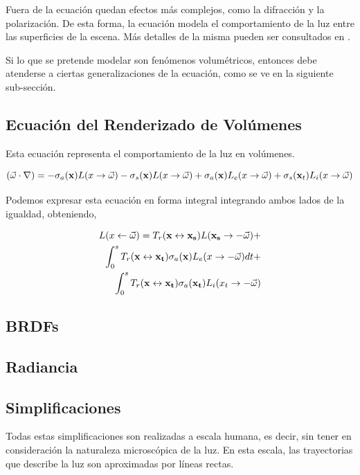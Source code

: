 Fuera de la ecuación quedan efectos más complejos, como la difracción y la polarización.
De esta forma, la ecuación modela el comportamiento de la luz entre las superficies de la escena.
Más detalles de la misma pueden ser consultados en \cite{Kajiya1986}.

Si lo que se pretende modelar son fenómenos volumétricos, entonces debe atenderse a ciertas generalizaciones de la ecuación, como se ve en la siguiente sub-sección.

\subsection{Ecuación del Renderizado de Volúmenes}

Esta ecuación representa el comportamiento de la luz en volúmenes.

\begin{equation}
(\vec{\omega} \cdot \nabla) = - \sigma_{a}(\bold{x}) L(x \rightarrow \vec{\omega}) - \sigma_{s}(\bold{x}) L(x \rightarrow \vec{\omega}) + \sigma_{a}(\bold{x}) L_{e}(x \rightarrow \vec{\omega}) + \sigma_{s}(\bold{x}_{t}) L_{i}(x \rightarrow \vec{\omega})
\end{equation}

Podemos expresar esta ecuación en forma integral integrando ambos lados de la igualdad, obteniendo,

\begin{equation}
\begin{aligned}
L(x \leftarrow \vec{\omega}) = T_{r}(\bold{x} \leftrightarrow \bold{x_{s}}) L(\bold{x_{s}} \rightarrow -\vec{\omega}) + \\
\int_{0}^{s}{T_{r}(\bold{x} \leftrightarrow \bold{x_{t}}) \sigma_{a}(\bold{x}) L_{e}(x \rightarrow -\vec{\omega}) dt } + \\
\int_{0}^{s}{T_{r}(\bold{x} \leftrightarrow \bold{x_{t}}) \sigma_{a}(\bold{x_{t}}) L_{i}(x_{t} \rightarrow -\vec{\omega})  }
\end{aligned}
\end{equation}



\subsection{BRDFs}
\subsection{Radiancia}
\subsection{Simplificaciones}
Todas estas simplificaciones son realizadas a escala humana, es decir, sin tener en consideración la naturaleza microscópica de la luz. En esta escala, las trayectorias que describe la luz son aproximadas por líneas rectas.
